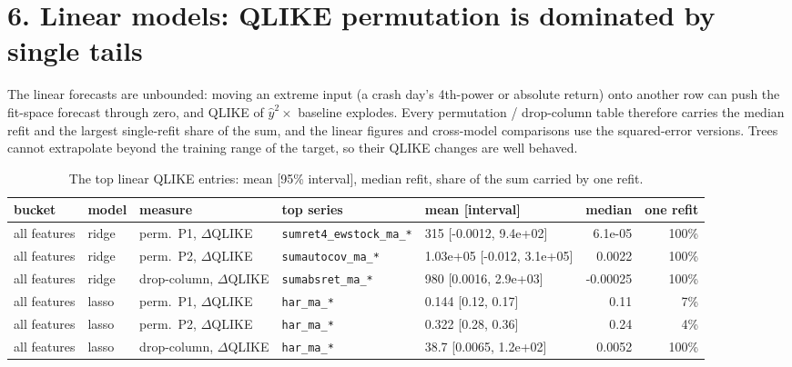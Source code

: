\documentclass[10pt]{article}
\begin{document}
\section*{6. Linear models: QLIKE permutation is dominated by single tails}
The linear forecasts are unbounded: moving an extreme input (a crash day's 4th-power or absolute return) onto another row can push the fit-space forecast through zero, and QLIKE of $\hat y^2\times$ baseline explodes. Every permutation / drop-column table therefore carries the median refit and the largest single-refit share of the sum, and the linear figures and cross-model comparisons use the squared-error versions. Trees cannot extrapolate beyond the training range of the target, so their QLIKE changes are well behaved.
\begin{table}[H]\centering\scriptsize
\caption{The top linear QLIKE entries: mean [95\% interval], median refit, share of the sum carried by one refit.}
\begin{tabular}{lllllrr}\toprule
bucket & model & measure & top series & mean [interval] & median & one refit\\\midrule
all features & ridge & perm.\ P1, $\Delta$QLIKE & \texttt{sumret4\_ewstock\_ma\_*} & 315 [-0.0012, 9.4e+02] & 6.1e-05 & 100\% \\
all features & ridge & perm.\ P2, $\Delta$QLIKE & \texttt{sumautocov\_ma\_*} & 1.03e+05 [-0.012, 3.1e+05] & 0.0022 & 100\% \\
all features & ridge & drop-column, $\Delta$QLIKE & \texttt{sumabsret\_ma\_*} & 980 [0.0016, 2.9e+03] & -0.00025 & 100\% \\
all features & lasso & perm.\ P1, $\Delta$QLIKE & \texttt{har\_ma\_*} & 0.144 [0.12, 0.17] & 0.11 & 7\% \\
all features & lasso & perm.\ P2, $\Delta$QLIKE & \texttt{har\_ma\_*} & 0.322 [0.28, 0.36] & 0.24 & 4\% \\
all features & lasso & drop-column, $\Delta$QLIKE & \texttt{har\_ma\_*} & 38.7 [0.0065, 1.2e+02] & 0.0052 & 100\% \\
\bottomrule\end{tabular}\end{table}
\end{document}
